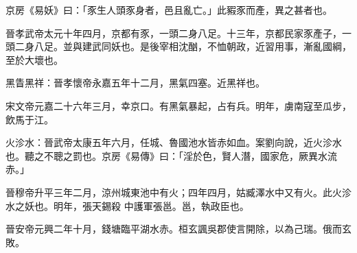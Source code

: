 \begin{pinyinscope}
 京房《易妖》曰：「豕生人頭豕身者，邑且亂亡。」此豭豕而產，異之甚者也。



 晉孝武帝太元十年四月，京都有豕，一頭二身八足。十三年，京都民家豕產子，一頭二身八足。並與建武同妖也。是後宰相沈酗，不恤朝政，近習用事，漸亂國綱，至於大壞也。



 黑眚黑祥：晉孝懷帝永嘉五年十二月，黑氣四塞。近黑祥也。



 宋文帝元嘉二十六年三月，幸京口。有黑氣暴起，占有兵。明年，虜南寇至瓜步，飲馬于江。



 火沴水：晉武帝太康五年六月，任城、魯國池水皆赤如血。案劉向說，近火沴水也。聽之不聰之罰也。京房《易傳》曰：「淫於色，賢人潛，國家危，厥異水流赤。」



 晉穆帝升平三年二月，涼州城東池中有火；四年四月，姑臧澤水中又有火。此火沴水之妖也。明年，張天錫殺
 中護軍張邕。邕，執政臣也。



 晉安帝元興二年十月，錢塘臨平湖水赤。桓玄諷吳郡使言開除，以為己瑞。俄而玄敗。



\end{pinyinscope}